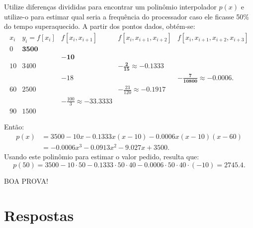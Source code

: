 \documentclass[12pt,a4paper]{article}
\begin{document}
\begin{ExerciseList}
Utilize diferenças divididas para encontrar um polinômio interpolador $p(x)$ e utilize-o para estimar qual seria a frequência do processador caso ele ficasse 50\% do tempo superaquecido.
\Answer
 A partir dos pontos dados, obtém-se:
\[
	\begin{array}{cccccc}
   x_i & y_i=f[x_i] & f[x_i,x_{i+1}] & f[x_i,x_{i+1},x_{i+2}]  & f[x_i,x_{i+1},x_{i+2},x_{i+3}] \\
     0 & \mathbf{3500} \\
	    &            & \mathbf{-10} \\
    10 & 3400 &             & \mathbf{-\frac{2}{15} \approx -0.1333} \\
	    &            & -18  &              & \mathbf{-\frac{7}{10800} \approx -0.0006}. \\
	60 & 2500 &             & -\frac{23}{120} \approx -0.1917\\
	    &            & -\frac{100}{3} \approx -33.3333 \\
	90 & 1500
	\end{array}
\]

Então:
\begin{align*}
p(x)
&=3500
 -10 x
 -0.1333 x(x-10)
 -0.0006 x(x-10)(x-60)\\
& = -0.0006 x^3 - 0.0913 x^2 - 9.027 x + 3500.
\end{align*}
Usando este polinômio para estimar o valor pedido, resulta que:
\[
p(50)
=3500 -10
  \cdot 50
-0.1333\cdot 50 \cdot 40
-0.0006\cdot 50 \cdot 40\cdot(-10)
= 2745.4.
\]
\end{ExerciseList}

\vspace{0.4cm}
\begin{center}
BOA PROVA!
\end{center}

\newpage
\restoregeometry
\section*{Respostas}
\shipoutAnswer
\end{document}
